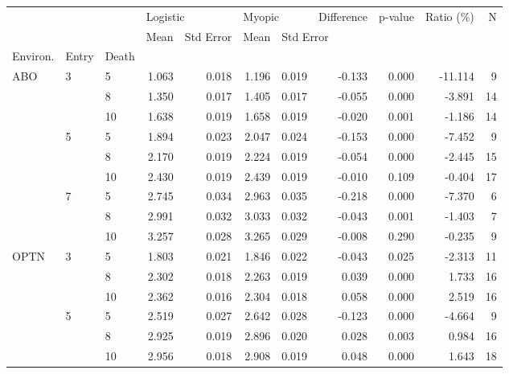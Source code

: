 \begin{tabular}{lllrrrrrrrr}
\toprule
    &   &    & \multicolumn{2}{l}{Logistic} & \multicolumn{2}{l}{Myopic} & Difference & p-value & Ratio (\%) &   N \\
    &   &    &     Mean & Std Error &   Mean & \multicolumn{5}{l}{Std Error} \\
Environ. & Entry & Death &          &           &        &           &            &         &           &     \\
\midrule
ABO & 3 & 5  &    1.063 &     0.018 &  1.196 &     0.019 &     -0.133 &   0.000 &   -11.114 &   9 \\
    &   & 8  &    1.350 &     0.017 &  1.405 &     0.017 &     -0.055 &   0.000 &    -3.891 &  14 \\
    &   & 10 &    1.638 &     0.019 &  1.658 &     0.019 &     -0.020 &   0.001 &    -1.186 &  14 \\
    & 5 & 5  &    1.894 &     0.023 &  2.047 &     0.024 &     -0.153 &   0.000 &    -7.452 &   9 \\
    &   & 8  &    2.170 &     0.019 &  2.224 &     0.019 &     -0.054 &   0.000 &    -2.445 &  15 \\
    &   & 10 &    2.430 &     0.019 &  2.439 &     0.019 &     -0.010 &   0.109 &    -0.404 &  17 \\
    & 7 & 5  &    2.745 &     0.034 &  2.963 &     0.035 &     -0.218 &   0.000 &    -7.370 &   6 \\
    &   & 8  &    2.991 &     0.032 &  3.033 &     0.032 &     -0.043 &   0.001 &    -1.403 &   7 \\
    &   & 10 &    3.257 &     0.028 &  3.265 &     0.029 &     -0.008 &   0.290 &    -0.235 &   9 \\
OPTN & 3 & 5  &    1.803 &     0.021 &  1.846 &     0.022 &     -0.043 &   0.025 &    -2.313 &  11 \\
    &   & 8  &    2.302 &     0.018 &  2.263 &     0.019 &      0.039 &   0.000 &     1.733 &  16 \\
    &   & 10 &    2.362 &     0.016 &  2.304 &     0.018 &      0.058 &   0.000 &     2.519 &  16 \\
    & 5 & 5  &    2.519 &     0.027 &  2.642 &     0.028 &     -0.123 &   0.000 &    -4.664 &   9 \\
    &   & 8  &    2.925 &     0.019 &  2.896 &     0.020 &      0.028 &   0.003 &     0.984 &  16 \\
    &   & 10 &    2.956 &     0.018 &  2.908 &     0.019 &      0.048 &   0.000 &     1.643 &  18 \\

\end{tabular}
